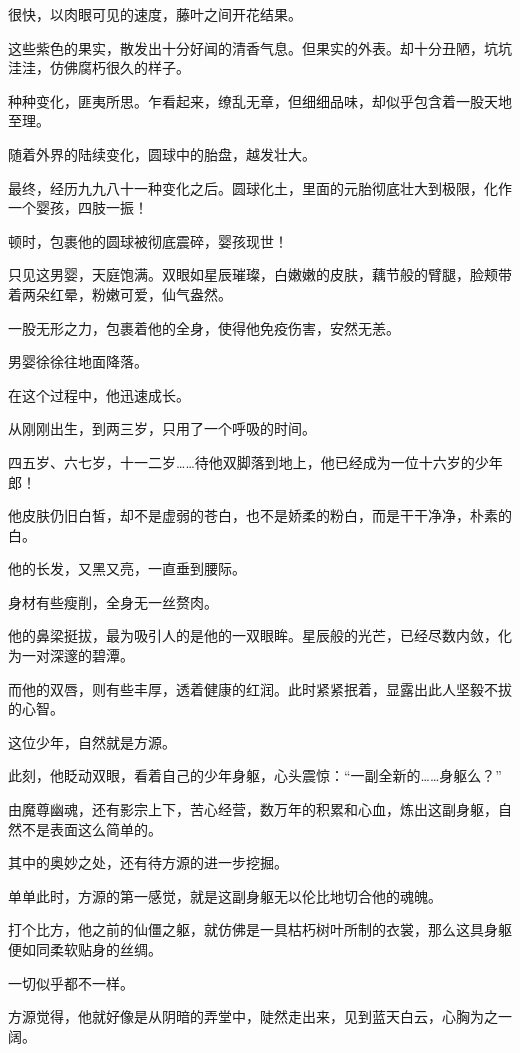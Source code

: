 \begin{this_body}
很快，以肉眼可见的速度，藤叶之间开花结果。

这些紫色的果实，散发出十分好闻的清香气息。但果实的外表。却十分丑陋，坑坑洼洼，仿佛腐朽很久的样子。

种种变化，匪夷所思。乍看起来，缭乱无章，但细细品味，却似乎包含着一股天地至理。

随着外界的陆续变化，圆球中的胎盘，越发壮大。

最终，经历九九八十一种变化之后。圆球化土，里面的元胎彻底壮大到极限，化作一个婴孩，四肢一振！

顿时，包裹他的圆球被彻底震碎，婴孩现世！

只见这男婴，天庭饱满。双眼如星辰璀璨，白嫩嫩的皮肤，藕节般的臂腿，脸颊带着两朵红晕，粉嫩可爱，仙气盎然。

一股无形之力，包裹着他的全身，使得他免疫伤害，安然无恙。

男婴徐徐往地面降落。

在这个过程中，他迅速成长。

从刚刚出生，到两三岁，只用了一个呼吸的时间。

四五岁、六七岁，十一二岁……待他双脚落到地上，他已经成为一位十六岁的少年郎！

他皮肤仍旧白皙，却不是虚弱的苍白，也不是娇柔的粉白，而是干干净净，朴素的白。

他的长发，又黑又亮，一直垂到腰际。

身材有些瘦削，全身无一丝赘肉。

他的鼻梁挺拔，最为吸引人的是他的一双眼眸。星辰般的光芒，已经尽数内敛，化为一对深邃的碧潭。

而他的双唇，则有些丰厚，透着健康的红润。此时紧紧抿着，显露出此人坚毅不拔的心智。

这位少年，自然就是方源。

此刻，他眨动双眼，看着自己的少年身躯，心头震惊：“一副全新的……身躯么？”

由魔尊幽魂，还有影宗上下，苦心经营，数万年的积累和心血，炼出这副身躯，自然不是表面这么简单的。

其中的奥妙之处，还有待方源的进一步挖掘。

单单此时，方源的第一感觉，就是这副身躯无以伦比地切合他的魂魄。

打个比方，他之前的仙僵之躯，就仿佛是一具枯朽树叶所制的衣裳，那么这具身躯便如同柔软贴身的丝绸。

一切似乎都不一样。

方源觉得，他就好像是从阴暗的弄堂中，陡然走出来，见到蓝天白云，心胸为之一阔。


\end{this_body}
